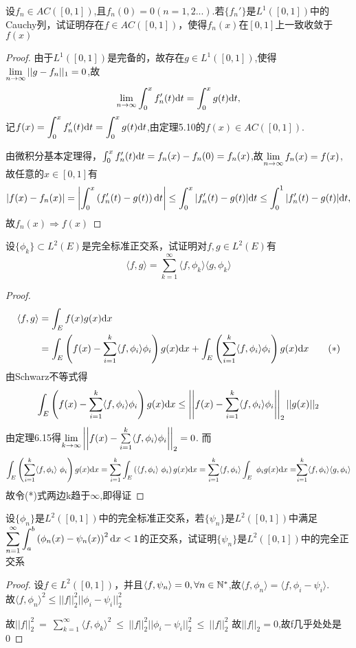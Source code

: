 设$f_n \in AC([0,1])$,且$f_n(0)=0(n=1,2...)$.若$\{f_n'\}$是$L^1([0,1])$中的Cauchy列，试证明存在$f\in AC([0,1])$，使得$f_n(x)$在$[0,1]$上一致收敛于$f(x)$
\begin{proof}
	由于$L^1([0,1])$是完备的，故存在$g\in L^1([0,1])$,使得$\lim\limits_{n\to \infty}||g-f_n||_1=0$,故$$\lim\limits_{n\to \infty}\displaystyle{\int_0^xf_n'(t)\mathrm{d}t=\int_0^xg(t)\mathrm{d}t},$$记$\displaystyle{f(x)=\int_0^xf_n'(t)\mathrm{d}t=\int_0^xg(t)\mathrm{d}t}$,由定理5.10的$f(x)\in AC([0,1])$.\par 由微积分基本定理得，$\int_0^xf_n'(t)\mathrm{d}t=f_n(x)-f_n(0)=f_n(x)$,故$\lim\limits_{n\to \infty}f_n(x)=f(x)$,故任意的$x\in [0,1]$有$$\left|f(x)-f_n(x)\right|=\displaystyle{\left| \int_0^x\left(f_n'(t)-g(t) \right)\mathrm{d}t\right| \leq \int_0^x|f_n'(t)-g(t) |\mathrm{d}t \leq \int_0^1|f_n'(t)-g(t) |\mathrm{d}t },$$故$f_n(x)\Rightarrow f(x)$
\end{proof}



设$\{\phi_k\}\subset L^2(E)$是完全标准正交系，试证明对$f,g\in L^2(E)$有$$\langle f,g\rangle=\displaystyle{\sum\limits_{k=1}^{\infty}\langle f,\phi_k\rangle \langle g,\phi_k\rangle}$$
\begin{proof}
	\[\begin{split}
	\langle f,g\rangle&=\int_Ef(x)g(x)\mathrm{d}x\\&=\int_E\left(f(x)-\sum\limits_{i=1}^k \langle f,\phi_i \rangle\phi_i \right)g(x)\mathrm{d}x+ \int_E\left(\sum\limits_{i=1}^k \langle f,\phi_i \rangle\phi_i \right)g(x)\mathrm{d}x\qquad(*)
	\end{split}\]
	由Schwarz不等式得$$\int_E\left(f(x)-\sum\limits_{i=1}^k \langle f,\phi_i \rangle\phi_i \right)g(x)\mathrm{d}x\leq \left| \left| f(x)-\sum\limits_{i=1}^k \langle f,\phi_i \rangle\phi_i\right| \right|_2||g(x)||_2 $$
	由定理6.15得$\lim\limits_{k\to\infty}\left| \left| f(x)-\sum\limits_{i=1}^k \langle f,\phi_i \rangle\phi_i\right| \right|_2=0$.	而$$\displaystyle{\int_E\left(\sum\limits_{i=1}^k \langle f,\phi_i \rangle\ \phi_i \right)g(x)\mathrm{d}x=\sum\limits_{i=1}^k\int_E\left( \langle f,\phi_i \rangle\ \phi_i \right)g(x)\mathrm{d}x=\sum\limits_{i=1}^k\langle f,\phi_i \rangle\int_E\ \phi_i g(x)\mathrm{d}x=}\displaystyle{\sum\limits_{i=1}^k\langle f,\phi_i\rangle \langle g,\phi_i\rangle}$$
	故令(*)式两边k趋于$\infty$,即得证
\end{proof}


设$\{\phi_n\}$是$L^2([0,1])$中的完全标准正交系，若$\{\psi_n\}$是$L^2([0,1])$中满足$\displaystyle{\sum\limits_{n=1}^{\infty}\int_a^b\left( \phi_n(x)-\psi_n(x)\right)^2\mathrm{d}x<1} $的正交系，试证明$\{\psi_n\}$是$L^2([0,1])$中的完全正交系
\begin{proof}
	设$f\in L^2([0,1])$，并且$\langle f,\psi_n \rangle=0,\forall n\in \mathbb{N}^{*}$,故$\langle f,\phi_n\rangle=\langle f,\phi_i-\psi_i\rangle$.\\故$\langle f,\phi_n\rangle^2\leq ||f||_2^2||\phi_i-\psi_i||_2^2$ \par
	故$||f||_2^2\ =\ \displaystyle{\sum\limits_{k=1}^{\infty}\langle f,\phi_k\rangle^2}\ \leq\  ||f||_2^2||\phi_i-\psi_i||_2^2\ \leq\  ||f||_2^2$
	故$||f||_2=0$,故f几乎处处是0
\end{proof}